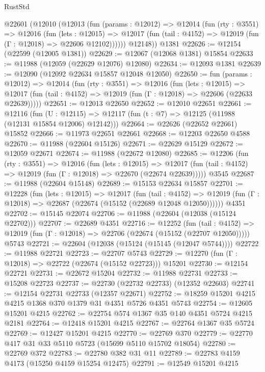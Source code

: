 \begin{lexlean}{RustStd}
\begin{coremodule}
    @22601
      (@12010
        (@12013
          (fun (params : @12012) =>
          @12014
            (fun (rty : @3551) =>
            @12016
              (fun (lets : @12015) =>
              @12017 (fun (tail : @4152) => @12019 (fun (Γ : @12018) => @22606 @12102))))))
        @12148))
    @1381
@22626 := @12154 (@22599 (@12005 @1381))
@22629 := @12067 (@12068 @1381) @15854
@22633 := @11988 (@12059 (@22629 @12076) @12080)
@22634 := @12093 @1381
@22639 := @12090 (@12092 @22634 @15857 @12048 @12050)
@22650 := fun (params : @12012) =>
  @12014
    (fun (rty : @3551) =>
    @12016
      (fun (lets : @12015) =>
      @12017 (fun (tail : @4152) => @12019 (fun (Γ : @12018) => @22606 (@22633 @22639)))))
@22651 := @12013 @22650
@22652 := @12010 @22651
@22661 := @12116
    (fun (U : @12115) => @12117 (fun (t : @7) => @12125 (@11988 (@12131 @15854 @12006) @12142)))
@22664 := @22626 (@22652 @22661) @15852
@22666 := @11973 @22651 @22661
@22668 := @12203 @22650 @4588
@22670 := @11988 (@22604 @15126)
@22671 := @22629 @15129
@22672 := @12059 @22671
@22674 := @11988 (@22672 @12080)
@22685 := @12206
    (fun (rty : @3551) =>
    @12016
      (fun (lets : @12015) =>
      @12017 (fun (tail : @4152) => @12019 (fun (Γ : @12018) => @22670 (@22674 @22639)))))
    @3545
@22687 := @11988 (@22604 @15148)
@22689 := @15153 @22634 @15857
@22701 := @12228
    (fun (lets : @12015) =>
    @12017
      (fun (tail : @4152) =>
      @12019 (fun (Γ : @12018) => @22687 (@22674 (@15152 (@22689 @12048 @12050))))))
    @4351
@22702 := @15145 @22074
@22706 := @11988 (@22604 (@12038 (@15124 @22702)))
@22707 := @22689 @4351
@22716 := @12252
    (fun (tail : @4152) => @12019 (fun (Γ : @12018) => @22706 (@22674 (@15152 (@22707 @12050)))))
    @5743
@22721 := @22604 (@12038 (@15124 (@15145 (@12047 @5744))))
@22722 := @11988 @22721
@22723 := @22707 @5743
@22729 := @12270 (fun (Γ : @12018) => @22722 (@22674 (@15152 @22723))) @15201
@22730 := @12154 @22721
@22731 := @22672 @15204
@22732 := @11988 @22731
@22733 := @15208 @22723
@22737 := @22730 (@22732 @22733) (@12352 @22603)
@22741 := @12154 @22731 @22733 (@12357 @22671)
@22752 := @18259 @15201 @4215 @4215 @1368 @370 @1379 @31 @4351 @5726 @4351 @5743
@22754 := @12605 @15201 @4215
@22762 := @22754 @574 @1367 @35 @140 @4351 @5724 @4215 @2181
@22764 := @12418 @15201 @4215
@22767 := @22764 @1367 @35 @5724
@22769 := @12427 @15201 @4215
@22770 := @22769 @370
@22779 := @22770 @417 @31 @33 @5110 @5723 (@15699 @5110 @15702 @18054)
@22780 := @22769 @372
@22783 := @22780 @382 @31 @11
@22789 := @22783 @4159 @4173 (@15250 @4159 @15254 @12475)
@22791 := @12549 @15201 @4215

\end{coremodule}
\end{lexlean}
